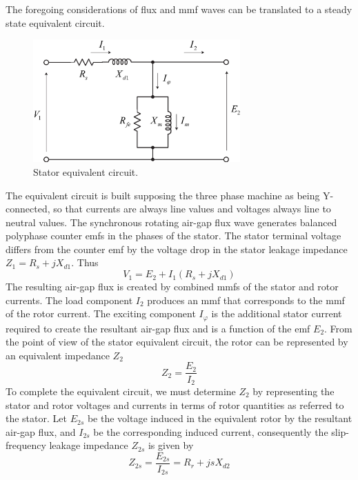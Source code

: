 \documentclass[11pt,a4paper,oneside]{book}
\numberwithin{equation}{section}
\theoremstyle{it}
\theoremstyle{definition}
\begin{document}
The foregoing considerations of flux and mmf waves can be translated to a steady state equivalent circuit.
\begin{figure}[htbp]
	\centering
	\includegraphics[width = 225pt, keepaspectratio]{figures/stator_equivalent_circuit.eps}
	\captionsetup{width=0.5\textwidth}		
	\caption{Stator equivalent circuit.}
	\label{figure:stator_eq_circuit} 
\end{figure}

The equivalent circuit is built supposing the three phase machine as being Y-connected, so that currents are always line values and voltages always line to neutral values.
The synchronous rotating air-gap flux wave generates balanced polyphase counter emfs in the phases of the stator. The stator terminal voltage differs from the counter emf by the voltage drop in the stator leakage impedance $Z_1 = R_s + jX_{d1}$. Thus
\begin{equation} \label{eq5}
	V_1 = E_2 + I_1 (R_s + jX_{d1})
\end{equation}
The resulting air-gap flux is created by combined mmfs of the stator and rotor currents. The load component $I_2$ produces an mmf that corresponds to the mmf of the rotor current. The exciting component $I_{\varphi}$ is the additional stator current required to create the resultant air-gap flux and is a function of the emf $E_2$.
From the point of view of the stator equivalent circuit, the rotor can be represented by an equivalent impedance $Z_2$
\begin{equation} \label{eq6}
	Z_2 = \frac{E_2}{I_2}
\end{equation}
To complete the equivalent circuit, we must determine $Z_2$ by representing the stator and rotor voltages and currents in terms of rotor quantities as referred to the stator.
Let $E_{2s}$ be the voltage induced in the equivalent rotor by the resultant air-gap flux, and $I_{2s}$ be the corresponding induced current, consequently the slip-frequency leakage impedance $Z_{2s}$ is given by
\begin{equation} \label{eq7}
	Z_{2s} = \frac{E_{2s}}{I_{2s}} = R_r+jsX_{d2}
\end{equation}
\end{document}
